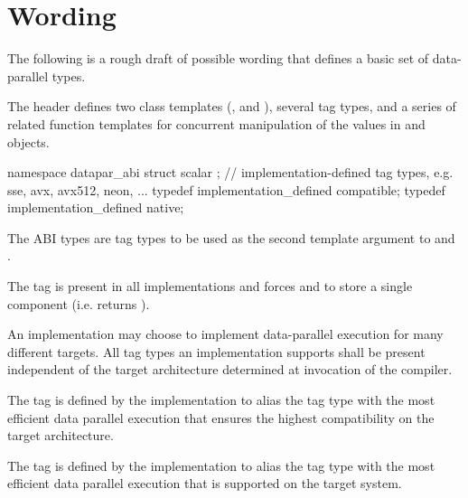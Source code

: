 \section{Wording}

The following is a rough draft of possible wording that defines a basic set of data-parallel types.

\begin{wgText}

  

  \pnum
  The header  defines two class templates (\datapar, and \mask), several tag types, and a series of related function templates for concurrent manipulation of the values in \datapar and \mask objects.

  \begin{itemdecl}
namespace datapar_abi {
  struct scalar {};
  // implementation-defined tag types, e.g. sse, avx, avx512, neon, ...
  typedef implementation_defined compatible;
  typedef implementation_defined native;
}
  \end{itemdecl}
  \begin{itemdescr}
    \pnum
    The ABI types are tag types to be used as the second template argument to \datapar and \mask.

    \pnum
    The  tag is present in all implementations and forces \datapar and \mask to store a single component (i.e. \datapar{} returns ).

    \pnum
    An implementation may choose to implement data-parallel execution for many different targets.
    All tag types an implementation supports shall be present independent of the target architecture determined at invocation of the compiler.

    \pnum
    The  tag is defined by the implementation to alias the tag type with the most efficient data parallel execution that ensures the highest compatibility on the target architecture.

    \pnum
    The  tag is defined by the implementation to alias the tag type with the most efficient data parallel execution that is supported on the target system.
  \end{itemdescr}


\end{wgText}
